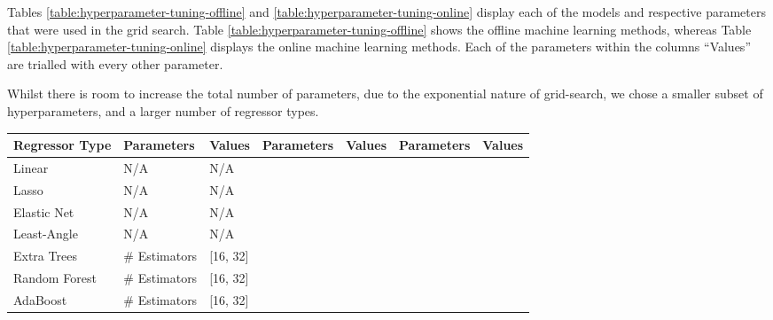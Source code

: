 \documentclass[final,3p,times,twocolumn,numbers]{elsarticle}
\begin{document}
Tables \ref{table:hyperparameter-tuning-offline} and \ref{table:hyperparameter-tuning-online} display each of the models and respective parameters that were used in the grid search. Table \ref{table:hyperparameter-tuning-offline} shows the offline machine learning methods, whereas Table \ref{table:hyperparameter-tuning-online} displays the online machine learning methods. Each of the parameters within the columns ``Values'' are trialled with every other parameter.

Whilst there is room to increase the total number of parameters, due to the exponential nature of grid-search, we chose a smaller subset of hyperparameters, and a larger number of regressor types.



\begin{table}
\centering
\begin{tabular}{@{}lllllll@{}}
\toprule
\textbf{Regressor Type} & \textbf{Parameters} & \textbf{Values}   & \textbf{Parameters} & \textbf{Values} & \textbf{Parameters} & \textbf{Values}       \\ \midrule
Linear                  & N/A                 & N/A               &                     &                 &                     &                       \\
Lasso                   & N/A                 & N/A               &                     &                 &                     &                       \\
Elastic Net             & N/A                 & N/A               &                     &                 &                     &                       \\
Least-Angle             & N/A                 & N/A               &                     &                 &                     &                       \\
Extra Trees             & \# Estimators       & {[}16, 32{]}      &                     &                 &                     &                       \\
Random Forest           & \# Estimators       & {[}16, 32{]}      &                     &                 &                     &                       \\
AdaBoost                & \# Estimators       & {[}16, 32{]}      &                     &                 &                     &                       \\

\end{tabular}
\end{table}
\end{document}
